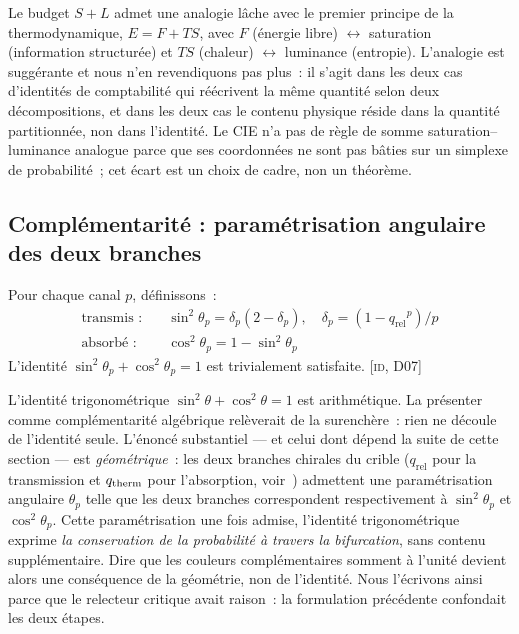 \documentclass[12pt,a4paper]{article}
\providecommand{\qrel}{\ensuremath{q_{\mathrm{rel}}}}
\begin{document}
\begin{remark}
Le budget $S + L$ admet une analogie l\^ache avec le premier principe
de la thermodynamique, $E = F + TS$, avec $F$ (\'energie libre)
$\leftrightarrow$ saturation (information structur\'ee) et $TS$
(chaleur) $\leftrightarrow$ luminance (entropie). L'analogie est
sugg\'erante et nous n'en revendiquons pas plus~: il s'agit dans les
deux cas d'identit\'es de comptabilit\'e qui r\'e\'ecrivent la m\^eme
quantit\'e selon deux d\'ecompositions, et dans les deux cas le
contenu physique r\'eside dans la quantit\'e partitionn\'ee, non dans
l'identit\'e. Le CIE n'a pas de r\`egle de somme saturation--luminance
analogue parce que ses coordonn\'ees ne sont pas b\^aties sur un
simplexe de probabilit\'e~; cet \'ecart est un choix de cadre, non un
th\'eor\`eme.
\end{remark}

\subsection{Compl\'ementarit\'e : param\'etrisation angulaire des deux branches}

\begin{identitybox}
Pour chaque canal $p$, d\'efinissons~:
\begin{align}
  \text{transmis~:} & \quad \sin^2\!\theta_p = \delta_p(2-\delta_p),
    \quad \delta_p = (1-\qrel^p)/p \\
  \text{absorb\'e~:} & \quad \cos^2\!\theta_p = 1 - \sin^2\!\theta_p
\end{align}
L'identit\'e $\sin^2\!\theta_p + \cos^2\!\theta_p = 1$ est
trivialement satisfaite. \textsc{[id, D07]}
\end{identitybox}

\begin{remark}
L'identit\'e trigonom\'etrique $\sin^2\theta + \cos^2\theta = 1$ est
arithm\'etique. La pr\'esenter comme \og compl\'ementarit\'e
alg\'ebrique \fg{} rel\`everait de la surench\`ere~: rien ne d\'ecoule
de l'identit\'e seule. L'\'enonc\'e substantiel --- et celui dont
d\'epend la suite de cette section --- est \emph{g\'eom\'etrique}~:
les deux branches chirales du crible ($\qrel$ pour la transmission et
$q_{\mathrm{therm}}$ pour l'absorption, voir~\cite[Ch.~8]{senez2026math})
admettent une param\'etrisation angulaire $\theta_p$ telle que les
deux branches correspondent respectivement \`a $\sin^2\theta_p$ et
$\cos^2\theta_p$. Cette param\'etrisation une fois admise, l'identit\'e
trigonom\'etrique exprime \emph{la conservation de la probabilit\'e \`a
travers la bifurcation}, sans contenu suppl\'ementaire. Dire que \og
les couleurs compl\'ementaires somment \`a l'unit\'e \fg{} devient
alors une cons\'equence de la g\'eom\'etrie, non de l'identit\'e. Nous
l'\'ecrivons ainsi parce que le relecteur critique avait raison~: la
formulation pr\'ec\'edente confondait les deux \'etapes.
\end{remark}
\end{document}
